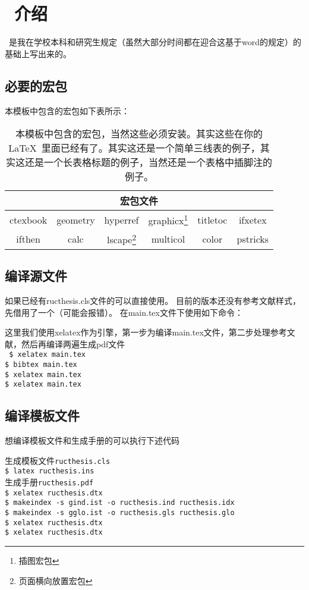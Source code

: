 \chapter{\RUCThesis\ 介绍}
\RUCThesis\ 是我在学校本科和研究生规定（虽然大部分时间都在迎合这基于word的规定）的基础上写出来的。\par
\section{必要的宏包}
本模板中包含的宏包如下表所示：
\begin{table}[htb]
  \centering
  \begin{minipage}[t]{0.8\linewidth} 
  \caption[必要宏包]{本模板中包含的宏包，当然这些必须安装。其实这些在你的\LaTeX\ 里面已经有了。其实这还是一个简单三线表的例子，其实这还是一个长表格标题的例子，当然还是一个表格中插脚注的例子。}
  \label{tab:template-files}
    \begin{tabular*}{\linewidth}{cccccc}
      \toprule[1.5pt]
       \multicolumn{6}{c}{\sf 宏包文件}\\ \midrule[1pt] 
      ctexbook & geometry & hyperref & graphicx\footnote{插图宏包} & titletoc & ifxetex \\ 
      ifthen  & calc & lscape\footnote{页面横向放置宏包}   & multicol & color   & pstricks\\
      \bottomrule[1.5pt]
    \end{tabular*}
  \end{minipage}
\end{table}

\section{编译源文件}
如果已经有ructhesis.cls文件的可以直接使用。
目前的版本还没有参考文献样式，先借用了一个（可能会报错）。 
在main.tex文件下使用如下命令：

这里我们使用xelatex作为引擎，第一步为编译main.tex文件，第二步处理参考文献，然后再编译两遍生成pdf文件\\
{\tt
\$ xelatex main.tex\\
\$ bibtex main.tex\\
\$ xelatex main.tex\\
\$ xelatex main.tex\\}
\section{编译模板文件}
想编译模板文件和生成手册的可以执行下述代码\par
生成模板文件{\tt ructhesis.cls}\\
{\tt\$ latex ructhesis.ins}\\
生成手册{\tt ructhesis.pdf\\
\$ xelatex ructhesis.dtx\\
\$ makeindex -s gind.ist -o ructhesis.ind ructhesis.idx\\
\$ makeindex -s gglo.ist -o ructhesis.gls ructhesis.glo\\
\$ xelatex ructhesis.dtx\\
\$ xelatex ructhesis.dtx}
